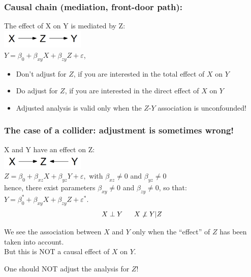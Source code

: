 \documentclass[10pt,dvipsnames,t,handout%
,aspectratio=169%
]{beamer}%
\begin{document}
\begin{frame}
	\frametitle{Causal chain (mediation, front-door path):}
	The effect of X on Y is \alert{mediated} by  Z:   \\[0.5cm]
	\includegraphics[width=4cm]{chain}\\[0.5cm]
	
	$Y = \beta_0 +  \beta_{xy} X + \beta_{zy} Z + \varepsilon $, \\[0.3cm]
	
	\pause
	\begin{itemize}
		\item 
	\alert{Don't adjust for $Z$},  if you are interested in the \alert{total effect} of $X$ on $Y$  
\item \alert{Do adjust for $Z$},  if you are interested in the \alert{direct effect} of $X$ on $Y$ 
\item Adjusted analysis is valid only when the $Z$-$Y$ association is unconfounded! 
\end{itemize}
	

\end{frame}

\begin{frame}
\frametitle{The case of a \alert{collider}: adjustment is sometimes wrong!}
X and Y have an effect on  Z:   \\[0.5cm]
\includegraphics[width=4cm]{collider}\\[0.3cm]

$Z = \beta_0 +  \beta_{xz} X + \beta_{yz} Y + \varepsilon,$ with $\beta_{xz}\ne 0$ and $\beta_{yz}\ne 0$ \\[0.2cm]
hence, there exist parameters 
$\beta_{xy}\ne 0$ and $\beta_{zy}\ne 0$, so that: \\
$Y = \beta^*_0 +  \beta_{xy} X + \beta_{zy} Z + \varepsilon^*. $\\[0.2cm]
$$X \perp Y \; \hspace{0.5cm} 
X \not\perp Y|Z$$

 
\pause
\begin{block}{ }
We see the association between $X$ and $Y$ only when the ``effect'' of  $Z$ has been taken into account. \\
\alert{But this is NOT a causal effect of $X$ on $Y$.} 
\end{block}

\alert<2>{One should NOT adjust the analysis for $Z$!}
\end{frame}
\end{document}

